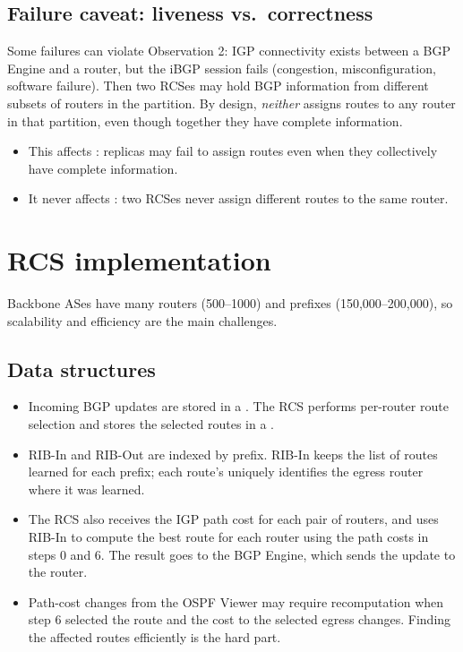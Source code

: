 \subsection{Failure caveat: liveness vs.\ correctness}
Some failures can violate Observation 2: IGP connectivity exists between a BGP Engine and a router, but the iBGP session fails (congestion, misconfiguration, software failure). Then two RCSes may hold BGP information from different subsets of routers in the partition. By design, \emph{neither} assigns routes to any router in that partition, even though together they have complete information.
\begin{itemize}
\item This affects : replicas may fail to assign routes even when they collectively have complete information.
\item It never affects : two RCSes never assign different routes to the same router.
\end{itemize}

\section{RCS implementation}
Backbone ASes have many routers (500--1000) and prefixes (150,000--200,000), so scalability and efficiency are the main challenges.
\subsection{Data structures}
\begin{itemize}
\item Incoming BGP updates are stored in a . The RCS performs per-router route selection and stores the selected routes in a .
\item RIB-In and RIB-Out are  indexed by prefix. RIB-In keeps the list of routes learned for each prefix; each route's  uniquely identifies the egress router where it was learned.
\item The RCS also receives the IGP path cost for each pair of routers, and uses RIB-In to compute the best route for each router using the path costs in steps 0 and 6. The result goes to the BGP Engine, which sends the update to the router.
\item Path-cost changes from the OSPF Viewer may require recomputation when step 6 selected the route and the cost to the selected egress changes. Finding the affected routes efficiently is the hard part.
\end{itemize}

